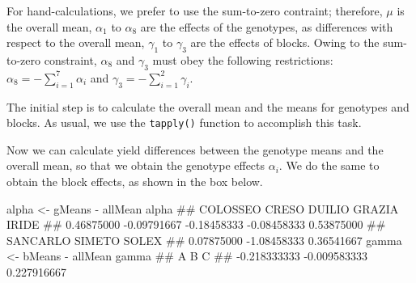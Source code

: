 \documentclass[a4paper,12pt,oneside]{book}
\newenvironment{Shaded}{\begin{snugshade}}{\end{snugshade}}
\newcommand{\SpecialCharTok}[1]{#1}
\newcommand{\DocumentationTok}[1]{#1}
\newcommand{\OtherTok}[1]{#1}
\newcommand{\FunctionTok}[1]{#1}
\newcommand{\NormalTok}[1]{#1}
\begin{document}
For hand-calculations, we prefer to use the sum-to-zero contraint; therefore, \(\mu\) is the overall mean, \(\alpha_1\) to \(\alpha_8\) are the effects of the genotypes, as differences with respect to the overall mean, \(\gamma_1\) to \(\gamma_3\) are the effects of blocks. Owing to the sum-to-zero constraint, \(\alpha_8\) and \(\gamma_3\) must obey the following restrictions: \(\alpha_8 = -\sum_{i=1}^{7} \alpha_i\) and \(\gamma_3 = -\sum_{i=1}^{2} \gamma_i\).

The initial step is to calculate the overall mean and the means for genotypes and blocks. As usual, we use the \texttt{tapply()} function to accomplish this task.

\vspace{12pt}

\begin{Shaded}
\end{Shaded}

Now we can calculate yield differences between the genotype means and the overall mean, so that we obtain the genotype effects \(\alpha_i\). We do the same to obtain the block effects, as shown in the box below.

\vspace{12pt}

\begin{Shaded}
\begin{Highlighting}[]
\NormalTok{alpha }\OtherTok{\textless{}{-}}\NormalTok{ gMeans }\SpecialCharTok{{-}}\NormalTok{ allMean}
\NormalTok{alpha}
\DocumentationTok{\#\#    COLOSSEO       CRESO      DUILIO      GRAZIA       IRIDE }
\DocumentationTok{\#\#  0.46875000 {-}0.09791667 {-}0.18458333 {-}0.08458333  0.53875000 }
\DocumentationTok{\#\#    SANCARLO      SIMETO       SOLEX }
\DocumentationTok{\#\#  0.07875000 {-}1.08458333  0.36541667}
\NormalTok{gamma }\OtherTok{\textless{}{-}}\NormalTok{ bMeans }\SpecialCharTok{{-}}\NormalTok{ allMean}
\NormalTok{gamma}
\DocumentationTok{\#\#            A            B            C }
\DocumentationTok{\#\# {-}0.218333333 {-}0.009583333  0.227916667}
\end{Highlighting}
\end{Shaded}
\end{document}
